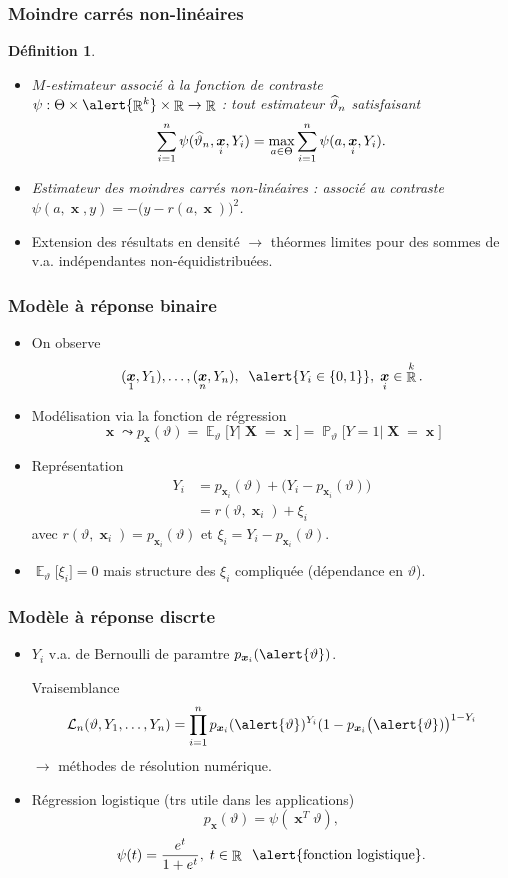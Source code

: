 \documentclass{beamer}
\newtheorem{df}{Définition}
\DeclareMathOperator{\E}{{\mathbb E}}
\DeclareMathOperator{\R}{{\mathbb R}}
\DeclareMathOperator{\PP}{{\mathbb P}}
\DeclareMathOperator{\bX}{\boldsymbol{X}}
\DeclareMathOperator{\bx}{\boldsymbol{x}}
\DeclareMathOperator{\est}{\widehat \vartheta_{\mathnormal{n}}}
\begin{document}
\begin{frame}
\frametitle{Moindre carrés non-linéaires}
\begin{df}
\begin{itemize}
\item $M$-estimateur associé à la \alert{fonction de contraste} $\psi:\Theta \times \alert{\R^k}\times \R\rightarrow \R$ : tout estimateur $\est$ satisfaisant
$$\sum_{i = 1}^n \psi(\est, \bx_i, Y_i) = \max_{a \in \Theta} \sum_{i = 1}^n \psi(a,\bx_i,Y_i).$$
\item Estimateur des \alert{moindres carrés non-linéaires} : associé au contraste $\psi(a,\bx,y) = -\big(y-r(a,\bx)\big)^2$.
\end{itemize}
\end{df}
\begin{itemize}
\item \alert{Extension} des résultats en densité
$\rightarrow$ théormes limites pour des sommes de v.a.
indépendantes \alert{ non-équidistribuées}.
\end{itemize}
\end{frame}

\begin{frame}
\frametitle{Modèle à réponse binaire}
\begin{itemize}
\item On observe
$$(\bx_1,Y_1),\ldots, (\bx_n,Y_n),\;\;\alert{Y_i \in \{0,1\}},\;\bx_i \in \R^k.$$
\item Modélisation \alert{via la fonction de régression}
$$\bx \leadsto p_{\bx}(\vartheta) = \E_\vartheta\big[Y|\bX = \bx\big] = \PP_\vartheta\big[Y = 1|\bX=\bx\big]$$
\item \alert{Représentation}
\begin{align*}
Y_i & =  p_{\bx_i}(\vartheta)+\big(Y_i-p_{\bx_i}(\vartheta)\big) \\
& = r(\vartheta,\bx_i)+\xi_i
\end{align*}
avec
$r(\vartheta, \bx_i) = p_{\bx_i}(\vartheta)$ et $\xi_i = Y_i-p_{\bx_i}(\vartheta).$
\item $\E_\vartheta\big[\xi_i\big]=0$ mais structure des $\xi_i$ \alert{compliquée} (dépendance en $\vartheta$).
\end{itemize}
\end{frame}

\begin{frame}
\frametitle{Modèle à réponse discrte}
\begin{itemize}
\item $Y_i $ v.a. de Bernoulli de paramtre $p_{\bx_i}(\alert{\vartheta})$.

\alert{ Vraisemblance}
$${\mathcal L}_n(\vartheta,Y_1,\ldots, Y_n) = \prod_{i = 1}^n p_{\bx_i}(\alert{\vartheta})^{Y_i}(1-p_{\bx_i}\big(\alert{\vartheta})\big)^{1-Y_i}$$
$\rightarrow$ méthodes de résolution numérique.
\item \alert{ Régression logistique} (trs utile dans les applications)
$$p_{\bx}(\vartheta) = \psi(\bx^T\vartheta),$$
$$\psi(t)=\frac{e^t}{1+e^t},\;t \in \R\;\;\alert{{\text{fonction logistique}}}.$$
\end{itemize}
\end{frame}
\end{document}
